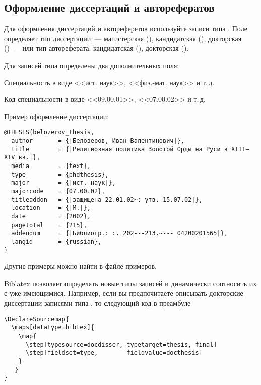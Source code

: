 \documentclass[10pt,a4paper,headings=small,numbers=enddot,english,russian]{ltxdockit}
\newcommand*{\biblatex}{Biblatex\xspace}
\begin{document}
\subsection{Оформление диссертаций и авторефератов}
\label{sec:dissers}

Для оформления диссертаций и автореферетов
используйте записи типа . Поле 
определяет тип диссертации~--- магистерская (), кандидатская (),
докторская ()~--- или тип автореферата: кандидатская (),
докторская ().

Для записей типа  определены два дополнительных поля:

\begin{fieldlist}


Специальность в виде <<ист. наук>>, <<физ.-мат. наук>> и т.\,д.


Код специальности в виде <<09.00.01>>, <<07.00.02>> и т.\,д.

\end{fieldlist}

Пример оформление диссертации:

\begin{lstlisting}[style=bibtex,escapechar=|]
@THESIS{belozerov_thesis,
  author       = {|Белозеров, Иван Валентинович|},
  title        = {|Религиозная политика Золотой Орды на Руси в XIII—XIV вв.|},
  media        = {text},
  type         = {phdthesis},
  major        = {|ист. наук|},
  majorcode    = {07.00.02},
  titleaddon   = {|защищена 22.01.02~: утв. 15.07.02|},
  location     = {|М.|},
  date         = {2002},
  pagetotal    = {215},
  addendum     = {|Библиогр.: с. 202---213.~--- 04200201565|},
  langid       = {russian},
}
\end{lstlisting}

Другие примеры можно найти в файле примеров.

\biblatex позволяет определять новые типы записей и динамически соотносить их
с уже имеющимися.
Например, если вы предпочитаете описывать докторские диссертации записями типа
, то следующий код в преамбуле

\begin{lstlisting}[style=latex]
\DeclareSourcemap{
  \maps[datatype=bibtex]{
    \map{
      \step[typesource=docdisser, typetarget=thesis, final]
      \step[fieldset=type,        fieldvalue=docthesis]
    }
   }
}
\end{lstlisting}
\end{document}

